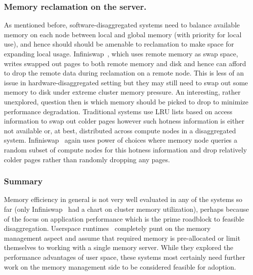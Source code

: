 \subsubsection{Memory reclamation on the server.}
As mentioned before, software-disaggregated systems need to 
balance available memory on each node between local and 
global memory (with priority for local use), and hence should 
should be amenable to reclamation to make space for expanding 
local usage. Infiniswap~\cite{infiniswap}, which 
uses remote memory as swap space, writes swapped out pages 
to both remote memory and disk and hence can afford to drop the 
remote data during reclamation on a remote node. This is less of 
an issue in hardware-disaggregated setting but they may still 
need to swap out some memory to disk under extreme cluster 
memory pressure. An interesting, rather unexplored, question then
is which memory should be picked to drop to minimize performance 
degradation. Traditional systems use LRU lists based on access
information to swap out colder pages however such hotness information 
is either not available or, at best, distributed across 
compute nodes in a disaggregated system. 
Infiniswap~\cite{infiniswap} again uses power of choices where 
memory node queries a random subset of compute nodes for this 
hotness information and drop relatively colder pages rather than
randomly dropping any pages.


\subsubsection{Summary}
Memory efficiency in general is not very well evaluated in any of 
the systems so far (only Infiniswap~\cite{infiniswap} had a chart on 
cluster memory utilization), perhaps because of the focus on application 
performance which is the prime roadblock to feasible disaggregation.
Userspace runtimes~\cite{aifm,semeru} completely punt on the 
memory management aspect and assume that required memory is 
pre-allocated or limit themselves to working with a single memory server. 
While they explored the performance advantages of 
user space, these systems most certainly need further work 
on the memory management side to be considered feasible for adoption. 

